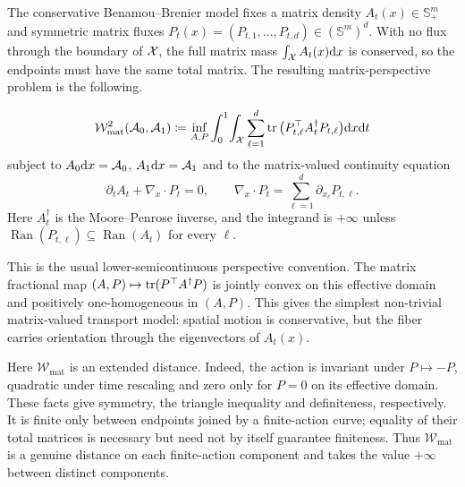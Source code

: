 The conservative Benamou--Brenier model fixes a matrix density $A_t(x)\in\mathbb S_+^m$ and symmetric matrix fluxes $P_t(x)=(P_{t,1},\ldots,P_{t,d})\in(\mathbb S^m)^d$. With no flux through the boundary of $\mathcal{X}$, the full matrix mass $\int_{\mathcal{X}} A_t(x)\mathrm{d} x$ is conserved, so the endpoints must have the same total matrix. The resulting matrix-perspective problem is the following.
\begin{defn}\label{def-matrix-valued-dynamic-transport}
\begin{equation}\label{eq-matrix-valued-bb}
\begin{aligned}
\mathcal W_{\mathrm{mat}}^2(\mathcal A_0,\mathcal A_1)
\coloneqq
\inf_{A,P}\int_0^1\!\int_{\mathcal{X}}
\sum_{\ell=1}^d \operatorname{tr}\big(P_{t,\ell}^{\top} A_t^\dagger P_{t,\ell}\big)\mathrm{d} x\mathrm{d} t
\end{aligned}
\end{equation}
subject to $A_0\mathrm{d} x=\mathcal A_0$, $A_1\mathrm{d} x=\mathcal A_1$ and to the matrix-valued continuity equation
\begin{equation}\label{eq-matrix-valued-continuity}
\partial_t A_t+\nabla_x\cdot P_t=0,
\qquad
\nabla_x\cdot P_t=\sum_{\ell=1}^d \partial_{x_\ell}P_{t,\ell}.
\end{equation}
Here $A_t^\dagger$ is the Moore--Penrose inverse, and the integrand is $+\infty$ unless
$\operatorname{Ran}(P_{t,\ell})\subseteq\operatorname{Ran}(A_t)$ for every $\ell$.
\end{defn}
This is the usual lower-semicontinuous perspective convention. The matrix fractional map $(A,P)\mapsto\operatorname{tr}(P^{\top}A^\dagger P)$ is jointly convex on this effective domain and positively one-homogeneous in $(A,P)$. This gives the simplest non-trivial matrix-valued transport model: spatial motion is conservative, but the fiber carries orientation through the eigenvectors of $A_t(x)$.

Here $\mathcal W_{\mathrm{mat}}$ is an extended distance. Indeed, the action is invariant under $P\mapsto-P$, quadratic under time rescaling and zero only for $P=0$ on its effective domain. These facts give symmetry, the triangle inequality and definiteness, respectively. It is finite only between endpoints joined by a finite-action curve; equality of their total matrices is necessary but need not by itself guarantee finiteness. Thus $\mathcal W_{\mathrm{mat}}$ is a genuine distance on each finite-action component and takes the value $+\infty$ between distinct components.

